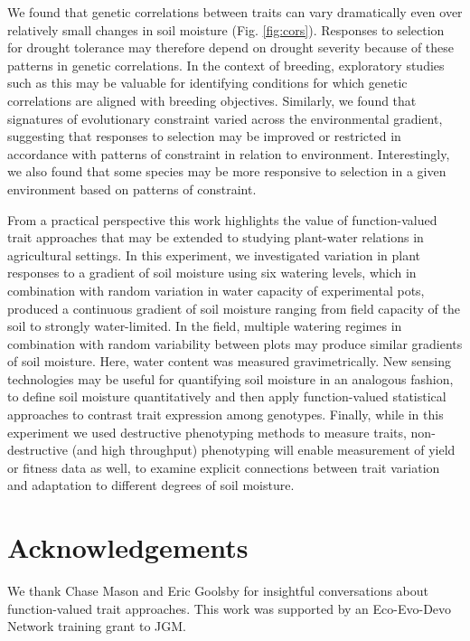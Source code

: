 \documentclass[jou,floatsintext]{apa6}
\begin{document}
We found that genetic correlations between traits can vary dramatically even over relatively small changes in soil moisture (Fig. \ref{fig:cors}). Responses to selection for drought tolerance may therefore depend on drought severity because of these patterns in genetic correlations. In the context of breeding, exploratory studies such as this may be valuable for identifying conditions for which genetic correlations are aligned with breeding objectives. Similarly, we found that signatures of evolutionary constraint varied across the environmental gradient, suggesting that responses to selection may be improved or restricted in accordance with patterns of constraint in relation to environment. Interestingly, we also found that some species may be more responsive to selection in a given environment based on patterns of constraint.

From a practical perspective this work highlights the value of function-valued trait approaches that may be extended to studying plant-water relations in agricultural settings. In this experiment, we investigated variation in plant responses to a gradient of soil moisture using six watering levels, which in combination with random variation in water capacity of experimental pots, produced a continuous gradient of soil moisture ranging from field capacity of the soil to strongly water-limited. In the field, multiple watering regimes in combination with random variability between plots may produce similar gradients of soil moisture. Here, water content was measured gravimetrically. New sensing technologies may be useful for quantifying soil moisture in an analogous fashion, to define soil moisture quantitatively and then apply function-valued statistical approaches to contrast trait expression among genotypes. Finally, while in this experiment we used destructive phenotyping methods to measure traits, non-destructive (and high throughput) phenotyping will enable measurement of yield or fitness data as well, to examine explicit connections between trait variation and adaptation to different degrees of soil moisture.

\hypertarget{acknowledgements}{%
\section{Acknowledgements}\label{acknowledgements}}

We thank Chase Mason and Eric Goolsby for insightful conversations about function-valued trait approaches. This work was supported by an Eco-Evo-Devo Network training grant to JGM.
\end{document}
